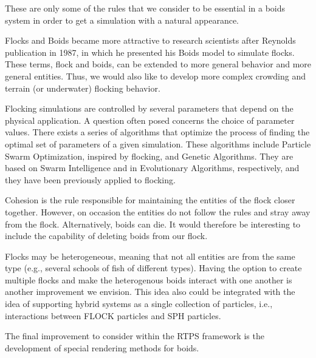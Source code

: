 These are only some of the rules that we consider to be essential in a boids system in order to get a simulation with a natural appearance.

Flocks and Boids became more attractive to research scientists after Reynolds publication in 1987\cite{craig1}, in which he presented his Boids model to simulate flocks. These terms, flock and boids, can be extended to more general behavior and more general entities. Thus, we would also like to develop more complex crowding and terrain (or underwater) flocking behavior\cite{supermassiveCrowd}. 

Flocking simulations are controlled by several parameters that depend on the physical application. A question often posed concerns the choice of {\correct} parameter values. 
There exists a series of algorithms that optimize the process of finding the optimal set of parameters of a given simulation. These algorithms include Particle Swarm Optimization, inspired by flocking, and Genetic Algorithms. They are based on Swarm Intelligence and in Evolutionary Algorithms, respectively, and they have been previously applied to flocking\cite{opt_params_GA}.

Cohesion is the rule responsible for maintaining the entities of the flock closer together. However, on occasion the entities do not follow the rules and stray away from the flock. Alternatively, boids can die. It would therefore be interesting to include the capability of deleting boids from our flock. 

Flocks may be heterogeneous, meaning that not all entities are from the same type  (e.g., several schools of fish of different types). Having the option to create multiple flocks and make the heterogenous boids interact with one another is another improvement we envision. This idea also could be integrated  with the idea of supporting hybrid systems as a single collection of particles, i.e., interactions between FLOCK particles and SPH particles.

The final improvement to consider within the RTPS framework is the development of special rendering methods for boids. 

